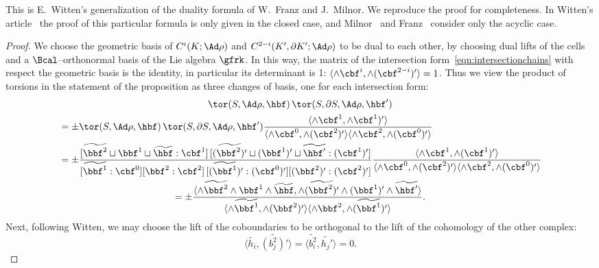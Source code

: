 This is E.~Witten's generalization of the duality formula of W.~Franz and J.~Milnor. We reproduce the proof for completeness. In Witten's article~\cite{Witten} the proof of this particular formula is only given in the closed case, and Milnor~\cite{MilnorDuality} and Franz~\cite{Franz37} consider only the acyclic case.


\begin{proof}
We choose the geometric basis of $C^i(K;\Ad\rho)$ and $C^{2-i}(K',\partial K';\Ad\rho)$ to be dual to each other, by choosing dual lifts of the cells and a $\Bcal$--orthonormal basis of the Lie algebra $\gfrk$. In this way, the matrix of the intersection form~\eqref{eqn:intersectionchains} with respect the geometric basis is the identity, in particular its determinant is 1: $\langle \wedge\cbf^i, \wedge(\cbf^{2-i})'\rangle=1$. Thus we view the product of torsions in the statement of the proposition as three changes of basis, one for each intersection form:
\begin{multline}\label{eqn:producttorsions}
\tor(S,\Ad\rho, {\hbf}) \,
\tor(S,\partial S,\Ad\rho, {\hbf}')\\
\begin{aligned}
&= \pm
\tor(S,\Ad\rho, {\hbf}) \,
\tor(S,\partial S,\Ad\rho, {\hbf}') \frac{\langle \wedge\cbf^1, \wedge\cbf^1)'\rangle}{\langle \wedge\cbf^0, \wedge(\cbf^2)'\rangle
\langle \wedge\cbf^2, \wedge(\cbf^0)'\rangle}
\\
&= \pm
\frac{[\widetilde{\bbf^2}\sqcup {\bbf^1}\sqcup \widetilde{\hbf} : \cbf^1]\, [\widetilde{(\bbf^2)'}\sqcup {(\bbf^1)'}\sqcup \widetilde{\hbf'} : (\cbf^1)'] }{ [\widetilde{\bbf^1} : \cbf^0] [{\bbf^2} : \cbf^2] \, [(\widetilde{\bbf^1})' : (\cbf^0)'] [({\bbf^2})' : (\cbf^2)']}
\frac{\langle \wedge\cbf^1, \wedge(\cbf^1)'\rangle}{\langle \wedge\cbf^0, \wedge(\cbf^2)'\rangle
\langle \wedge\cbf^2, \wedge(\cbf^0)'\rangle}
\end{aligned}
\\
= \pm \frac{
\langle \wedge \widetilde{\bbf^2} \wedge {\bbf^1} \wedge \widetilde{\hbf},
\wedge \widetilde{(\bbf^2)'} \wedge (\bbf^1)'\wedge \widetilde{\hbf'}
\rangle }{
\langle \wedge \widetilde{\bbf^1},\wedge ({\bbf^2})' \rangle
\langle \wedge {\bbf^2}, \wedge (\widetilde{\bbf^1})' \rangle }.
\end{multline}
Next, following Witten, we may choose the lift of the coboundaries to be orthogonal to the lift of the cohomology of the other complex:
\[
\langle \widetilde{ h_i}, \widetilde{(b^2_j)'} \rangle =
\langle \widetilde{ b^2_i}, \widetilde{ h_j'}\rangle =0.
\]
\end{proof}

